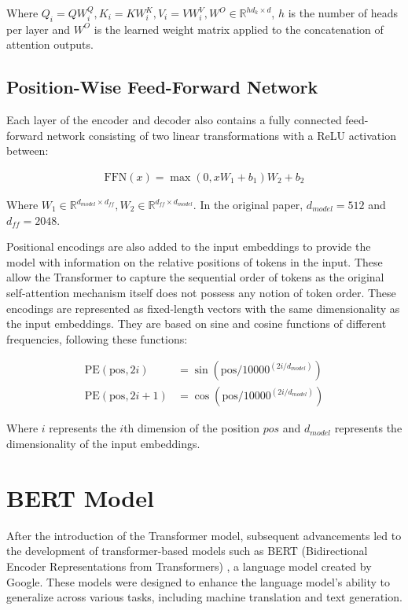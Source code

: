 Where $Q_{i} = QW_{i}^{Q}, K_{i} = KW_{i}^{K}, V_{i} = VW_{i}^{V}, W^{O} \in \mathbb{R}^{hd_{k} \times d}$, $h$ is the number of heads per layer and $W^{O}$ is the learned weight matrix applied to the concatenation of attention outputs.

\subsection{Position-Wise Feed-Forward Network}

Each layer of the encoder and decoder also contains a fully connected feed-forward network consisting of two linear transformations with a ReLU activation between:

\begin{equation}
    \begin{gathered}
        \text{FFN}(x) = \max \left(0, xW_{1} + b_{1}\right)W_{2} + b_{2}
    \end{gathered}
    \label{eq:ffnn}
\end{equation}

Where $W_1 \in \mathbb{R}^{d_{model} \times d_{ff}}, W_2 \in \mathbb{R}^{d_{ff} \times d_{model}}$. In the original paper, $d_{model} = 512$ and $d_{ff} = 2048$.

Positional encodings are also added to the input embeddings to provide the model with information on the relative positions of tokens in the input. These allow the Transformer to capture the sequential order of tokens as the original self-attention mechanism itself does not possess any notion of token order. These encodings are represented as fixed-length vectors with the same dimensionality as the input embeddings. They are based on sine and cosine functions of different frequencies, following these functions:

\begin{equation}
    \begin{aligned}
        \text{PE}(\text{pos}, 2i)     & = \sin\left(\text{pos} / 10000^{(2i/d_{model})}\right) \\
        \text{PE}(\text{pos}, 2i + 1) & = \cos\left(\text{pos} / 10000^{(2i/d_{model})}\right)
    \end{aligned}
    \label{eq:pos_embedding}
\end{equation}

Where $i$ represents the $i$th dimension of the position $pos$ and $d_{model}$ represents the dimensionality of the input embeddings.

\section{BERT Model}
\label{sec:BERT}
After the introduction of the Transformer model, subsequent advancements led to the development of transformer-based models such as BERT (Bidirectional Encoder Representations from Transformers) \cite{BERT}, a language model created by Google. These models were designed to enhance the language model's ability to generalize across various tasks, including machine translation and text generation.

